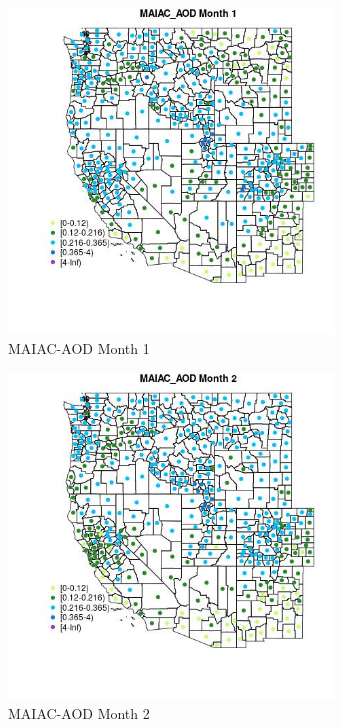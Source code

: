 \begin{figure} 
\centering  
\includegraphics[width=0.77\textwidth]{Code_Outputs/df_report_ML_predictors_CountyCentroid_Locations_Dates_2008-01-01to2018-12-31_MapObsMo1MAIAC_AOD.jpg} 
\caption{\label{fig:df_report_ML_predictors_CountyCentroid_Locations_Dates_2008-01-01to2018-12-31MapObsMo1MAIAC_AOD}MAIAC-AOD Month 1} 
\end{figure} 
 

\begin{figure} 
\centering  
\includegraphics[width=0.77\textwidth]{Code_Outputs/df_report_ML_predictors_CountyCentroid_Locations_Dates_2008-01-01to2018-12-31_MapObsMo2MAIAC_AOD.jpg} 
\caption{\label{fig:df_report_ML_predictors_CountyCentroid_Locations_Dates_2008-01-01to2018-12-31MapObsMo2MAIAC_AOD}MAIAC-AOD Month 2} 
\end{figure} 
 

